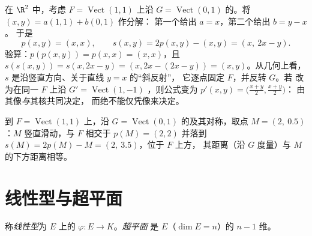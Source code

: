\begin{example}[投影及其对称的显式计算]
\label{ex:b1:linmaps:projexplicit}
在 $\R^2$ 中，考虑 $F = \operatorname{Vect}(1,1)$ 上沿 $G =
\operatorname{Vect}(0,1)$ 的。将 $(x, y) = a(1,1) + b(0,1)$ 作分解：
第一个给出 $a = x$，第二个给出 $b = y - x$。
于是
\[
p(x, y) = (x, x),
\qquad
s(x, y) = 2p(x,y) - (x,y) = (x,\ 2x - y).
\]
验算：$p(p(x,y)) = p(x,x) = (x,x)$，且 $s(s(x,y)) =
s(x, 2x - y) = (x, 2x - (2x - y)) = (x, y)$。从几何上看，$s$
是沿竖直方向、关于直线 $y = x$ 的“斜反射”，
它逐点固定 $F$，并反转 $G$。若
改为在同一 $F$ 上沿 $G' =
\operatorname{Vect}(1,-1)$ ，则公式变为
$p'(x,y) = \bigl(\frac{x+y}2, \frac{x+y}2\bigr)$：
由其像\emph{与}其核共同决定，
而绝不能仅凭像来决定。
\end{example}

\begin{omfigure}

{\small {}到 $F = \operatorname{Vect}(1,1)$ 上，沿
$G = \operatorname{Vect}(0,1)$ 的及其对称，取点 $M
= (2,\ 0.5)$：$M$ 竖直滑动，与 $F$ 相交于 $p(M) = (2,2)$
并落到 $s(M) = 2p(M) - M = (2,\ 3.5)$，位于 $F$ 上方，
其距离（沿 $G$ 度量）与 $M$ 的下方距离相等。}
\end{omfigure}

\section{线性型与超平面}

\begin{definition}\label{def:b1:linmaps:forms}
称\emph{线性型}为 $E$ 上的
$\varphi \colon E \to K$。\emph{超平面}
是 $E$（$\dim E = n$）的 $n - 1$ 维。
\end{definition}

